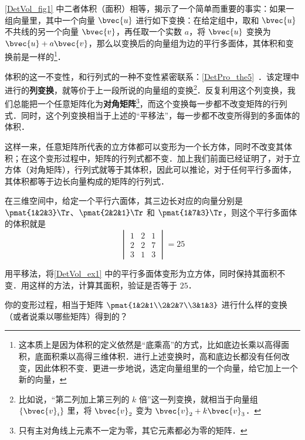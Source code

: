 \autoref{DetVol_fig1} 中二者体积（面积）相等，揭示了一个简单而重要的事实：如果一组向量里，其中一个向量 $\bvec{u}$ 进行如下变换：在给定组中，取和 $\bvec{u}$ 不共线的另一个向量 $\bvec{v}$，再任取一个实数 $a$，将 $\bvec{u}$ 变换为 $\bvec{u}+a\bvec{v}$，那么以变换后的向量组为边的平行多面体，其体积和变换前是一样的\footnote{这本质上是因为体积的定义依然是“底乘高”的方式，比如底边长乘以高得面积，底面积乘以高得三维体积．进行上述变换时，高和底边长都没有任何改变，因此体积不变．更进一步地说，选定向量组里的一个向量，给它加上一个新的向量，}．

体积的这一不变性，和行列式的一种不变性紧密联系：\autoref{DetPro_the5}~．该定理中进行的\textbf{列变换}，就等价于上一段所说的向量组的变换\footnote{比如说，“第二列加上第三列的 $k$ 倍”这一列变换，就相当于向量组 $\{\bvec{v}_i\}$ 里，将 $\bvec{v}_2$ 变为 $\bvec{v}_2+k\bvec{v}_3$．}．反复利用这个列变换，我们总能把一个任意矩阵化为\textbf{对角矩阵}\footnote{只有主对角线上元素不一定为零，其它元素都必为零的矩阵．}，而这个变换每一步都不改变矩阵的行列式．同时，这个列变换相当于上述的“平移法”，每一步都不改变所得到的多面体的体积．

这样一来，任意矩阵所代表的立方体都可以变形为一个长方体，同时不改变其体积；在这个变形过程中，矩阵的行列式都不变．加上我们前面已经证明了，对于立方体（对角矩阵），行列式就等于其体积，因此可以推论，对于任何平行多面体，其体积都等于边长向量构成的矩阵的行列式．

\begin{example}{}\label{DetVol_ex1}
在三维空间中，给定一个平行六面体，其三边长对应的向量分别是 $\pmat{1&2&3}\Tr$、$\pmat{2&2&1}\Tr$ 和 $\pmat{1&7&3}\Tr$，则这个平行多面体的体积就是
\begin{equation}
\begin{vmatrix}
1&2&1\\
2&2&7\\
3&1&3
\end{vmatrix} = 25
\end{equation}
\end{example}

\begin{exercise}{}
用平移法，将\autoref{DetVol_ex1} 中的平行多面体变形为立方体，同时保持其面积不变．用这样的方法，计算其面积，验证是否等于 $25$．

你的变形过程，相当于矩阵 $\pmat{1&2&1\\2&2&7\\3&1&3}$ 进行什么样的变换（或者说乘以哪些矩阵）得到的？
\end{exercise}



